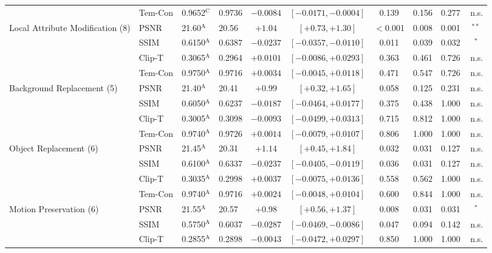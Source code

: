 \begin{longtable}{@{\extracolsep{\fill}} l l l l c c c c c c @{}}
 & Tem-Con & 0.9652$^{\mathrm{C}}$ & 0.9736 & $-0.0084$ & $[-0.0171, -0.0004]$ & 0.139 & 0.156 & 0.277 & \,{\scriptsize n.s.} \\
Local Attribute Modification (8) & PSNR & 21.60$^{\mathrm{A}}$ & 20.56 & $+1.04$ & $[+0.73, +1.30]$ & $<$0.001 & 0.008 & 0.001 & $^{**}$ \\
 & SSIM & 0.6150$^{\mathrm{A}}$ & 0.6387 & $-0.0237$ & $[-0.0357, -0.0110]$ & 0.011 & 0.039 & 0.032 & $^{*}$ \\
 & Clip-T & 0.3065$^{\mathrm{A}}$ & 0.2964 & $+0.0101$ & $[-0.0086, +0.0293]$ & 0.363 & 0.461 & 0.726 & \,{\scriptsize n.s.} \\
 & Tem-Con & 0.9750$^{\mathrm{A}}$ & 0.9716 & $+0.0034$ & $[-0.0045, +0.0118]$ & 0.471 & 0.547 & 0.726 & \,{\scriptsize n.s.} \\
Background Replacement (5) & PSNR & 21.40$^{\mathrm{A}}$ & 20.41 & $+0.99$ & $[+0.32, +1.65]$ & 0.058 & 0.125 & 0.231 & \,{\scriptsize n.s.} \\
 & SSIM & 0.6050$^{\mathrm{A}}$ & 0.6237 & $-0.0187$ & $[-0.0464, +0.0177]$ & 0.375 & 0.438 & 1.000 & \,{\scriptsize n.s.} \\
 & Clip-T & 0.3005$^{\mathrm{A}}$ & 0.3098 & $-0.0093$ & $[-0.0499, +0.0313]$ & 0.715 & 0.812 & 1.000 & \,{\scriptsize n.s.} \\
 & Tem-Con & 0.9740$^{\mathrm{A}}$ & 0.9726 & $+0.0014$ & $[-0.0079, +0.0107]$ & 0.806 & 1.000 & 1.000 & \,{\scriptsize n.s.} \\
Object Replacement (6) & PSNR & 21.45$^{\mathrm{A}}$ & 20.31 & $+1.14$ & $[+0.45, +1.84]$ & 0.032 & 0.031 & 0.127 & \,{\scriptsize n.s.} \\
 & SSIM & 0.6100$^{\mathrm{A}}$ & 0.6337 & $-0.0237$ & $[-0.0405, -0.0119]$ & 0.036 & 0.031 & 0.127 & \,{\scriptsize n.s.} \\
 & Clip-T & 0.3035$^{\mathrm{A}}$ & 0.2998 & $+0.0037$ & $[-0.0075, +0.0136]$ & 0.558 & 0.562 & 1.000 & \,{\scriptsize n.s.} \\
 & Tem-Con & 0.9740$^{\mathrm{A}}$ & 0.9716 & $+0.0024$ & $[-0.0048, +0.0104]$ & 0.600 & 0.844 & 1.000 & \,{\scriptsize n.s.} \\
Motion Preservation (6) & PSNR & 21.55$^{\mathrm{A}}$ & 20.57 & $+0.98$ & $[+0.56, +1.37]$ & 0.008 & 0.031 & 0.031 & $^{*}$ \\
 & SSIM & 0.5750$^{\mathrm{A}}$ & 0.6037 & $-0.0287$ & $[-0.0469, -0.0086]$ & 0.047 & 0.094 & 0.142 & \,{\scriptsize n.s.} \\
 & Clip-T & 0.2855$^{\mathrm{A}}$ & 0.2898 & $-0.0043$ & $[-0.0472, +0.0297]$ & 0.850 & 1.000 & 1.000 & \,{\scriptsize n.s.} \\

\end{longtable}
